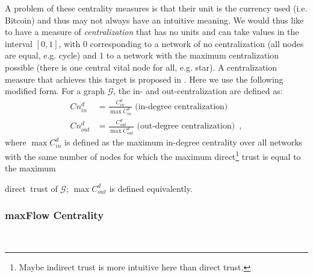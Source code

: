     A problem of these centrality measures is that their unit is the currency used (i.e. Bitcoin) and thus may not always have
    an intuitive meaning. We would thus like to have a measure of \textit{centralization} that has no units and can take
    values in the interval $\left[0,1\right]$, with 0 corresponding to a network of no centralization (all nodes are equal,
    e.g.  cycle) and 1 to a network with the maximum centralization possible (there is one central vital node for all, e.g.
    star). A centralization measure that achieves this target is proposed in \cite{freeman}. Here we use the following
    modified form. For a graph $\mathcal{G}$, the in- and out-centralization are defined as:
    \begin{align*}
      Cn^d_{in} &= \frac{C^d_{in}}{\max C^d_{in}} \mbox{ (in-degree centralization)} \\
      Cn^d_{out} &= \frac{C^d_{out}}{\max C^d_{out}} \mbox{ (out-degree centralization)} \enspace,
    \end{align*}
    where $\max C^d_{in}$ is defined as the maximum in-degree centrality over all networks with the same number of nodes for
    which the maximum direct\footnote{Maybe indirect trust is more intuitive here than direct trust.} trust is equal to the
    maximum \addtocounter{footnote}{-1}direct\footnotemark \ trust of $\mathcal{G}$; $\max C^d_{out}$ is defined equivalently.

  \subsubsection{maxFlow Centrality} \ \\

